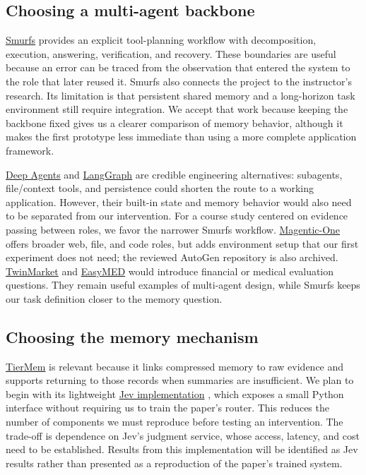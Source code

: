 \documentclass[a4paper,11pt]{article}
\begin{document}
\subsection{Choosing a multi-agent backbone}
\href{https://github.com/FreedomIntelligence/Smurfs}{Smurfs} \cite{smurfs2025} provides an explicit tool-planning workflow with decomposition, execution, answering, verification, and recovery. These boundaries are useful because an error can be traced from the observation that entered the system to the role that later reused it. Smurfs also connects the project to the instructor's research. Its limitation is that persistent shared memory and a long-horizon task environment still require integration. We accept that work because keeping the backbone fixed gives us a clearer comparison of memory behavior, although it makes the first prototype less immediate than using a more complete application framework.\par

\href{https://github.com/langchain-ai/deepagents}{Deep Agents} and \href{https://github.com/langchain-ai/langgraph}{LangGraph} \cite{deepagents2026} are credible engineering alternatives: subagents, file/context tools, and persistence could shorten the route to a working application. However, their built-in state and memory behavior would also need to be separated from our intervention. For a course study centered on evidence passing between roles, we favor the narrower Smurfs workflow. \href{https://github.com/microsoft/autogen}{Magentic-One} \cite{magentic2024} offers broader web, file, and code roles, but adds environment setup that our first experiment does not need; the reviewed AutoGen repository is also archived. \href{https://github.com/FreedomIntelligence/TwinMarket}{TwinMarket} \cite{twinmarket2025} and \href{https://github.com/FreedomIntelligence/EasyMED}{EasyMED} \cite{easymed2025} would introduce financial or medical evaluation questions. They remain useful examples of multi-agent design, while Smurfs keeps our task definition closer to the memory question.\par

\subsection{Choosing the memory mechanism}
\href{https://github.com/FreedomIntelligence/Tiermem}{TierMem} \cite{tiermem2026} is relevant because it links compressed memory to raw evidence and supports returning to those records when summaries are insufficient. We plan to begin with its lightweight \href{https://github.com/FreedomIntelligence/Tiermem/tree/d0d3896e917117ba0fcc1501e2b2dae891d2a2e3/jev_tiermem}{Jev implementation} \cite{jev2026}, which exposes a small Python interface without requiring us to train the paper's router. This reduces the number of components we must reproduce before testing an intervention. The trade-off is dependence on Jev's judgment service, whose access, latency, and cost need to be established. Results from this implementation will be identified as Jev results rather than presented as a reproduction of the paper's trained system.\par
\end{document}
